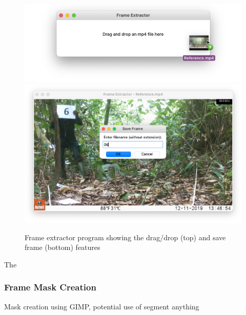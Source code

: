 \begin{figure}[htbp]
    \centering
    \includegraphics[scale=0.5]{body/experimental/assets/frame_extractor/drag_drop}
    \vspace{-3mm}
    \includegraphics[scale=0.5]{body/experimental/assets/frame_extractor/save_frame}
    \caption{Frame extractor program showing the drag/drop (top) and save frame (bottom) features}
    \label{fig:frame_extractor}
\end{figure}

\clearpage

The

\subsubsection{Frame Mask Creation}
Mask creation using GIMP, potential use of segment anything